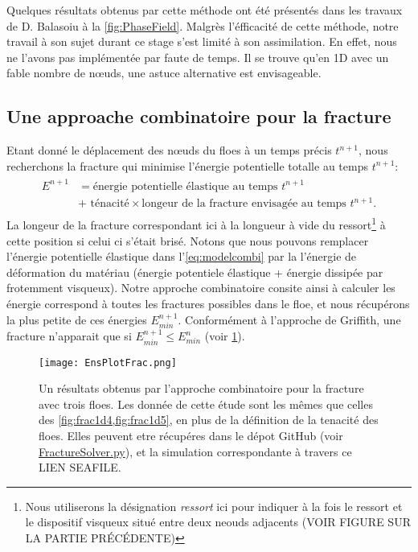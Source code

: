 Quelques résultats obtenus par cette méthode ont été présentés dans les travaux de D. Balasoiu à la \cref{fig:PhaseField}. Malgrès l'éfficacité de cette méthode, notre travail à son sujet durant ce stage s'est limité à son assimilation. En effet, nous ne l'avons pas implémentée par faute de temps. Il se trouve qu'en 1D avec un fable nombre de n\oe{}uds, une astuce alternative est envisageable. 




\subsection{Une approache combinatoire pour la fracture}
\label{subsubsec:approchecombi}


Etant donné le déplacement des n\oe{}uds du floes à un temps précis $t^{n+1}$, nous recherchons la fracture qui minimise l'énergie potentielle totalle au temps $t^{n+1}$:
\begin{align} \label{eq:modelcombi}
    \boxed{
    \begin{array}{rll}
    E^{n+1} & = \text{énergie potentielle élastique au temps } t^{n+1}  \\
    & + \text{ ténacité}\times \text{longeur de la fracture envisagée au temps }t^{n+1}.  
    \end{array}
    }
\end{align}
La longeur de la fracture correspondant ici à la longueur à vide du ressort\footnote{Nous utiliserons la désignation \emph{ressort} ici pour indiquer à la fois le ressort et le dispositif visqueux situé entre deux neouds adjacents (VOIR FIGURE SUR LA PARTIE PRÉCÉDENTE)} à cette position si celui ci s'était brisé. Notons que nous pouvons remplacer l'énergie potentielle élastique dans l'\cref{eq:modelcombi} par la l'énergie de déformation du matériau (énergie potentiele élastique + énergie dissipée par frotemment visqueux). Notre approche combinatoire consite ainsi à calculer les énergie correspond à toutes les fractures possibles dans le floe, et nous récupérons la plus petite de ces énergies $E^{n+1}_{min}$. Conformément à l'approche de Griffith, une fracture n'apparait que si $E^{n+1}_{min}\leq E^{n}_{min}$ (voir \cref{fig:fracture1d6}). 
\begin{figure}[!h]
    \centering
    \texttt{[image: EnsPlotFrac.png]}
    \caption{Un résultats obtenus par l'approche combinatoire pour la fracture avec trois floes. Les donnée de cette étude sont les mêmes que celles des \cref{fig:frac1d4,fig:frac1d5}, en plus de la définition de la tenacité des floes. Elles peuvent etre récupéres dans le dépot GitHub (voir \href{https://github.com/desmond-rn/ice-floes/blob/master/code/simu1D/FractureSolver.py}{FractureSolver.py}), et la simulation correspondante à travers ce LIEN SEAFILE.}
    \label{fig:fracture1d6}
\end{figure}

